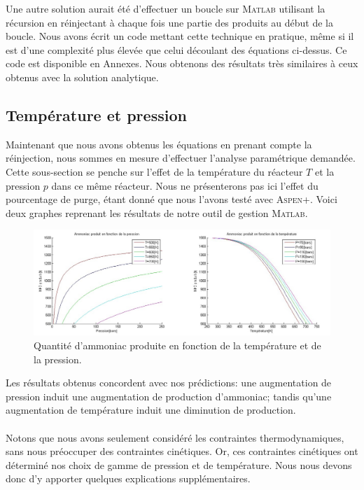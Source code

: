 Une autre solution aurait été d'effectuer un boucle sur \textsc{Matlab} utilisant la récursion en réinjectant à chaque fois une partie des produits au début de la boucle. Nous avons écrit un code mettant cette technique en pratique, même si il est d'une complexité plus élevée que celui découlant des équations ci-dessus. Ce code est disponible en Annexes. Nous obtenons des résultats très similaires à ceux obtenus avec la solution analytique.

\subsection{Température et pression}

Maintenant que nous avons obtenus les équations en prenant compte la réinjection, nous sommes en mesure d'effectuer l'analyse paramétrique demandée. Cette sous-section se penche sur l'effet de la température du réacteur $T$ et la pression $p$ dans ce même réacteur. Nous ne présenterons pas ici l'effet du pourcentage de purge, étant donné que nous l'avons testé avec \textsc{Aspen+}. Voici deux graphes reprenant les résultats de notre outil de gestion \textsc{Matlab}.

\begin{figure}[ht!]
\centering
\includegraphics[scale=0.4]{fct_pression.jpg}
\caption{Quantité d'ammoniac produite en fonction de la température et de la pression.}
\label{fct_pression}
\end{figure}

Les résultats obtenus concordent avec nos prédictions: une augmentation de pression induit une augmentation de production d'ammoniac; tandis qu'une augmentation de température induit une
diminution de production.

\paragraph{} Notons que nous avons seulement considéré les contraintes thermodynamiques, sans nous préoccuper des contraintes
cinétiques. Or, ces contraintes cinétiques ont déterminé nos choix de gamme de pression et de température. Nous nous
devons donc d'y apporter quelques explications supplémentaires.

